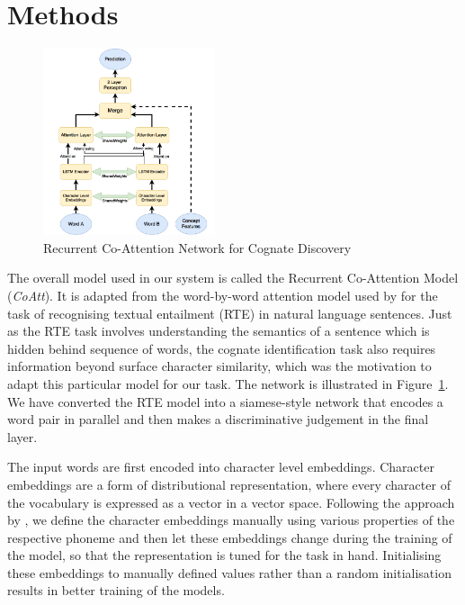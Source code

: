 \documentclass[11pt,letterpaper]{article}
\begin{document}
\section{Methods}

\begin{figure}[t]
	\centering
	\includegraphics[width=0.45\textwidth]{CoAttNetwork}
    \caption{Recurrent Co-Attention Network for Cognate Discovery}
    \label{CoAttNet}
\end{figure}

The overall model used in our system is called the Recurrent Co-Attention Model (\textit{CoAtt}). It is adapted from the word-by-word attention model used by \citet{rocktaschel2016reasoning} for the task of recognising textual entailment (RTE) in natural language sentences. Just as the RTE task involves understanding the semantics of a sentence which is hidden behind sequence of words, the cognate identification task also requires information beyond surface character similarity, which was the motivation to adapt this particular model for our task. The network is illustrated in Figure~\ref{CoAttNet}. We have converted the RTE model into a siamese-style network that encodes a word pair in parallel and then makes a discriminative judgement in the final layer. 

The input words are first encoded into character level embeddings. Character embeddings are a form of distributional representation, where every character of the vocabulary is expressed as a vector in a vector space. Following the approach by \citet{rama2016siamese}, we define the character embeddings manually using various properties of the respective phoneme and then let these embeddings change during the training of the model, so that the representation is tuned for the task in hand. Initialising these embeddings to manually defined values rather than a random initialisation results in better training of the models.
\end{document}
